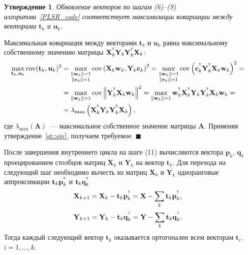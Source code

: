 \documentclass[12pt,twoside]{article}
\newtheorem{statement}{Утверждение}
\newcommand{\bw}{\mathbf{w}}
\newcommand{\bY}{\mathbf{Y}}
\newcommand{\bX}{\mathbf{X}}
\newcommand{\bu}{\mathbf{u}}
\newcommand{\bt}{\mathbf{t}}
\newcommand{\bp}{\mathbf{p}}
\newcommand{\bq}{\mathbf{q}}
\newcommand{\bc}{\mathbf{c}}
\newcommand{\T}{^{\text{\tiny\sffamily\upshape\mdseries T}}}
\begin{document}
\begin{statement}
Обновление векторов по шагам (6)--(9) алгоритма~\ref{PLSR_code} соответствует максимизации ковариации между векторами $\bt_k$ и $\bu_k$.
\end{statement}
Максимальная ковариация между векторами $\bt_k$ и $\bu_k$ равна максимальному собственному значению матрицы $\bX_k^{\T} \bY_k \bY_k^{\T} \bX_k$:
\begin{align*}
\max_{\bt_k, \bu_k}  \text{cov} (\bt_k, \bu_k)^2 &= \max_{\substack{\|\bw_k\|=1 \\ \|\bc_k\| = 1}} \text{cov} \left( \bX_k \bw_k, \bY_k \bc_k \right)^2 = \max_{\substack{\|\bw_k\|=1 \\ \|\bc_k\| = 1}} \text{cov} \left(\bc_k^{\T}  \bY_k^{\T} \bX_k \bw_k \right)^2 = \\
&= \max_{\|\bw_k\| = 1} \text{cov} \left\|\bY_k^{\T} \bX_k \bw_k \right\|^2 = \max_{\|\bw_k\| = 1} \bw_k^{\T} \bX_k^{\T} \bY_k \bY_k^{\T} \bX_k \bw_k = \\
& = \lambda_{\max} \left( \bX_k^{\T} \bY_k \bY_k^{\T} \bX_k \right),
\end{align*}
где $ \lambda_{\max} (\mathbf{A})$~--- максимальное собственное значение матрицы $\mathbf{A}$.
Применяя утверждение~\ref{st::eig}, получаем требуемое.
$\blacksquare$

После завершения внутреннего цикла на шаге (11) вычисляются вектора $\bp_k$, $\bq_k$ проецированием столбцов матриц $\bX_k$ и $\bY_k$ на вектор $\bt_k$. Для перехода на следующий шаг необходимо вычесть из матриц $\bX_k$ и $\bY_k$ одноранговые аппроксимации $\bt_k \bp_k^{\T}$ и $\bt_k \bq_k^{\T}$
\begin{equation*}
    \bX_{k + 1} = \bX_{k} - \bt_k \bp_k^{\T} = \bX - \sum_k \bt_k \bp_k^{\T},
\end{equation*}
\begin{equation*}
    \bY_{k + 1} = \bY_{k} - \bt_k \bq_k^{\T} = \bY - \sum_k \bt_k \bq_k^{\T}.
\end{equation*}
Тогда каждый следующий вектор $\bt_k$ оказывается ортогонален всем векторам $\bt_i$, $i=1, \dots, k$.
\end{document}
